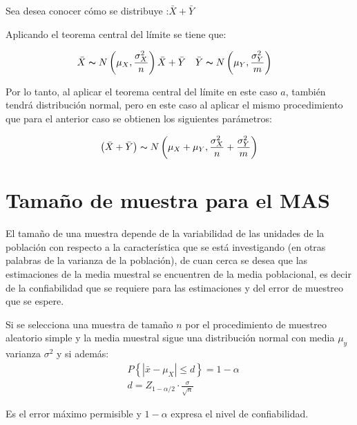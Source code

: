 Sea desea conocer cómo se distribuye :$\bar{X} +\bar{Y}$

Aplicando el teorema central del límite se tiene que:

\begin{align*}
     & \bar{X} \thicksim  N\left(  \mu_X,\frac{\sigma_X^2}{n} \right)\bar{X} +\bar{Y} &  & \bar{Y} \thicksim  N \left(  \mu_Y,\frac{\sigma_Y^2}{m} \right)
\end{align*}

Por lo tanto, al aplicar el teorema central del límite en este caso $a$, también tendrá distribución normal, pero en este caso al aplicar el mismo procedimiento que para el anterior caso se obtienen los siguientes parámetros:

\begin{equation*}
    \left( \bar{X} +\bar{Y} \right) \thicksim  N\left(  \mu_X+\mu_Y,\frac{\sigma_X^2}{n}+\frac{\sigma_Y^2}{m} \right)
\end{equation*}

\section{Tamaño de muestra para el MAS}

El tamaño de una muestra depende de la variabilidad de las unidades de la población con respecto a la característica que se está investigando (en otras palabras de la varianza de la población), de cuan cerca se desea que las estimaciones de la media muestral se encuentren de la media poblacional, es decir de la confiabilidad que se requiere para las estimaciones y del error de muestreo que se espere.

\begin{theorem}
    Si se selecciona una
    muestra de tamaño $n$ por el
    procedimiento de muestreo aleatorio
    simple y la media muestral sigue una
    distribución normal con media $\mu_y$
    varianza $\sigma^2$ y si además:
    \begin{align}
         & P\left\{\left\lvert\bar{x} -\mu_X \right\rvert \leq d \right\}=1-\alpha \\
         & d=Z_{1-\alpha/2}\cdot \frac{\sigma}{\sqrt{n}}
    \end{align}

    Es el error máximo permisible y $1-\alpha$  expresa el nivel de confiabilidad.
\end{theorem}


